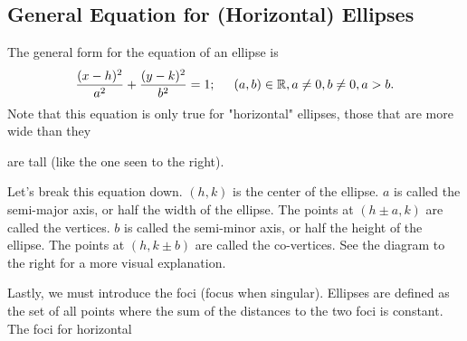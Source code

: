 \documentclass[lang=en,11pt]{elegantbook}
\begin{document}
\subsection{General Equation for (Horizontal) Ellipses}
\noindent The general form for the equation of an ellipse is
$$ \frac{(x-h)^2}{a^2} + \frac{(y-k)^2}{b^2} = 1; \hspace{5mm} (a,b)\in\mathbb{R},a\neq 0,b\neq 0,a>b.$$
Note that this equation is only true for "horizontal" ellipses, those that are more wide than they 

\begin{wrapfigure}{r}{5cm}
\centering
\end{wrapfigure}   

\noindent are tall (like the one seen to the right).     

Let's break this equation down.  $(h,k)$ is the center of the ellipse.  $a$ is called the semi-major axis, or half the width of the ellipse.  The points at $ (h \pm a, k) $ are called the vertices.  $b$ is called the semi-minor axis, or half the height of the ellipse.  The points at $ (h,k \pm b) $ are called the co-vertices.  See the diagram to the right for a more visual explanation.

Lastly, we must introduce the foci (focus when singular).  Ellipses are defined as the set of all points where the sum of the distances to the two foci is constant.  The foci for horizontal

\begin{wrapfigure}{r}{5cm}
\end{wrapfigure}
\end{document}
